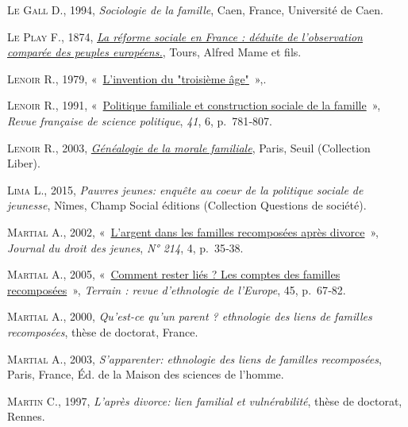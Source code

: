 \documentclass[
  12pt,
]{book}
\newlength{\cslhangindent}
\newenvironment{CSLReferences}[2] %
 {\begin{list}{}{%
  \setlength{\itemindent}{0pt}
  \setlength{\leftmargin}{0pt}
  \setlength{\parsep}{0pt}
  \ifodd #1
   \setlength{\leftmargin}{\cslhangindent}
   \setlength{\itemindent}{-1\cslhangindent}
  \fi
  \setlength{\itemsep}{#2\baselineskip}}}
 {\end{list}}
\begin{document}
\begin{CSLReferences}{0}{1}
\textsc{Le Gall D.}, 1994, \emph{Sociologie de la famille}, Caen,
France, Université de Caen.

\textsc{Le Play F.}, 1874,
\emph{\href{https://gallica.bnf.fr/ark:/12148/bpt6k209942s}{La réforme
sociale en France : déduite de l'observation comparée des peuples
européens.}}, Tours, Alfred Mame et fils.

\textsc{Lenoir R.}, 1979,
{«~\href{https://doi.org/10.3406/arss.1979.2630}{L'invention du
{"}troisième âge{"}}~»},.

\textsc{Lenoir R.}, 1991,
{«~\href{https://doi.org/10.3406/rfsp.1991.394601}{Politique familiale
et construction sociale de la famille}~»}, \emph{Revue française de
science politique}, \emph{41}, 6, p.~781‑807.

\textsc{Lenoir R.}, 2003,
\emph{\href{http://banq.pretnumerique.ca/accueil/isbn/9782021009064}{Généalogie
de la morale familiale}}, Paris, Seuil (Collection Liber).

\textsc{Lima L.}, 2015, \emph{Pauvres jeunes: enquête au coeur de la
politique sociale de jeunesse}, Nîmes, Champ Social éditions (Collection
Questions de société).

\textsc{Martial A.}, 2002,
{«~\href{http://www.cairn.info/revue-journal-du-droit-des-jeunes-2002-4-page-35.htm}{L'argent
dans les familles recomposées après divorce}~»}, \emph{Journal du droit
des jeunes}, \emph{N° 214}, 4, p.~35‑38.

\textsc{Martial A.}, 2005,
{«~\href{https://doi.org/10.4000/terrain.3550}{Comment rester liés ? Les
comptes des familles recomposées}~»}, \emph{Terrain : revue d'ethnologie
de l'Europe}, 45, p.~67‑82.

\textsc{Martial A.}, 2000, \emph{Qu'est-ce qu'un parent ? ethnologie des
liens de familles recomposées}, thèse de doctorat, France.

\textsc{Martial A.}, 2003, \emph{S'apparenter: ethnologie des liens de
familles recomposées}, Paris, France, Éd. de la Maison des sciences de
l'homme.

\textsc{Martin C.}, 1997, \emph{L'après divorce: lien familial et
vulnérabilité}, thèse de doctorat, Rennes.


\end{CSLReferences}
\end{document}
